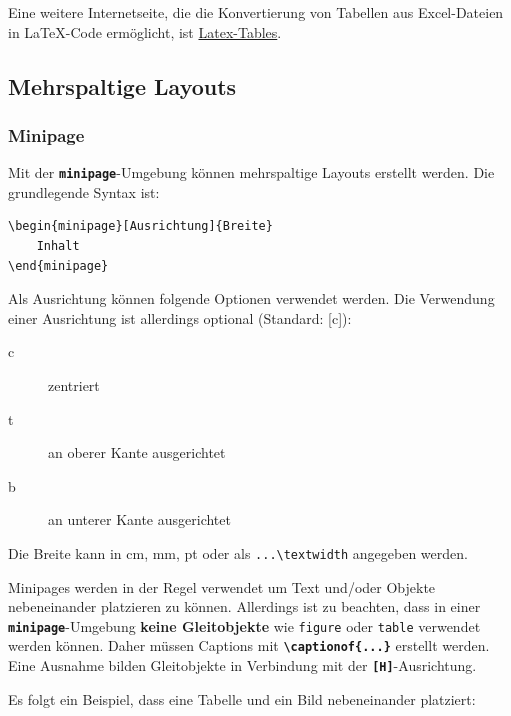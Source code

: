 Eine weitere Internetseite, die die Konvertierung von Tabellen aus Excel-Dateien in \LaTeX-Code ermöglicht, ist \href{https://www.latex-tables.com}{Latex-Tables}.


\subsection{Mehrspaltige Layouts}

\subsubsection{Minipage}
\label{sec:minipage}
Mit der \textbf{\texttt{minipage}}-Umgebung können mehrspaltige Layouts erstellt werden.
Die grundlegende Syntax ist:
\begin{lstlisting}[language={[LaTeX]TeX}]
\begin{minipage}[Ausrichtung]{Breite}
    Inhalt
\end{minipage}
\end{lstlisting}

Als Ausrichtung können folgende Optionen verwendet werden. Die Verwendung einer Ausrichtung ist allerdings optional (Standard: [c]):

\begin{description}
    \item[c] zentriert
    \item[t] an oberer Kante ausgerichtet
    \item[b] an unterer Kante ausgerichtet
\end{description}

\vspace{0.3cm}

Die Breite kann in cm, mm, pt oder als \texttt{...\textbackslash textwidth} angegeben werden.

Minipages werden in der Regel verwendet um Text und/oder Objekte nebeneinander platzieren zu können.
Allerdings ist zu beachten, dass in einer \textbf{\texttt{minipage}}-Umgebung \textbf{keine Gleitobjekte} wie \texttt{figure} oder \texttt{table} verwendet werden können. Daher müssen Captions mit \textbf{\texttt{\textbackslash captionof\{...\}}} erstellt werden.
Eine Ausnahme bilden Gleitobjekte in Verbindung mit der \textbf{\texttt{[H]}}-Ausrichtung.

Es folgt ein Beispiel, dass eine Tabelle und ein Bild nebeneinander platziert:

